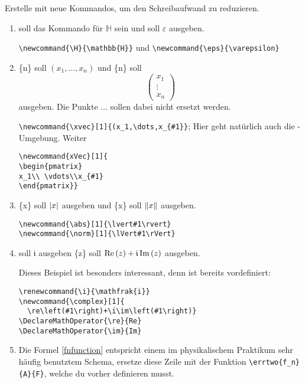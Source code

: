 \item Erstelle mit  neue Kommandos, um den Schreibaufwand zu reduzieren.
    \begin{enumerate}
        \item {} soll das Kommando für $\mathbb{H}$ sein und 
            soll $\varepsilon$ ausgeben.
            \begin{loesung}
                \verb|\newcommand{\H}{\mathbb{H}}| und \verb|\newcommand{\eps}{\varepsilon}|
            \end{loesung}
        \item {}\{n\} soll $(x_1,\dots,x_n)$ und \{n\} soll 
            \[
                \begin{pmatrix}
                x_1 \\ \vdots \\ x_n
                \end{pmatrix}
            \]
            ausgeben. Die Punkte $\dots$ sollen dabei nicht ersetzt werden.
            \begin{loesung}
                \verb|\newcommand{\xvec}[1]{(x_1,\dots,x_{#1}}|; Hier geht
                natürlich auch die -Umgebung. Weiter
            \begin{verbatim}
\newcommand{xVec}[1]{
\begin{pmatrix}
x_1\\ \vdots\\x_{#1}
\end{pmatrix}}
            \end{verbatim}
            \end{loesung}
        \item {}\{x\} soll $\abs{x}$ ausgeben und \{x\}
            soll $\norm{x}$ ausgeben.
            \begin{loesung}
                \begin{verbatim}
\newcommand{\abs}[1]{\lvert#1\rvert}
\newcommand{\norm}[1]{\lVert#1\rVert}
                \end{verbatim}
            \end{loesung}
        \item {} soll $\mathfrak{i}$ ausgeben \{z\} soll
            $\complex{z}$ ausgeben.
            \begin{loesung}
                Dieses Beispiel ist besonders interessant, denn  ist
                bereits vordefiniert: 
                \begin{verbatim}
\renewcommand{\i}{\mathfrak{i}}
\newcommand{\complex}[1]{
  \re\left(#1\right)+\i\im\left(#1\right)}
\DeclareMathOperator{\re}{Re}
\DeclareMathOperator{\im}{Im}
                \end{verbatim}
            \end{loesung}
        \item Die Formel \eqref{fnfunction} entspricht einem im physikalischem 
            Praktikum sehr häufig benutztem Schema, ersetze diese Zeile mit der
            Funktion \verb|\errtwo{f_n}{A}{F}|, welche du vorher definieren musst.
    \end{enumerate}